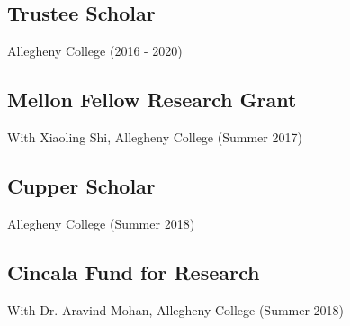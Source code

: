 \documentclass[12pt]{article}
\begin{document}
\begin{multicols}{2}
\subsection*{Trustee Scholar}
Allegheny College (2016 - 2020)

\subsection*{Mellon Fellow Research Grant}
With Xiaoling Shi, Allegheny College (Summer 2017)

\subsection*{Cupper Scholar}
Allegheny College (Summer 2018)

\subsection*{Cincala Fund for Research}
With Dr. Aravind Mohan, Allegheny College (Summer 2018)

\end{multicols}
\end{document}
